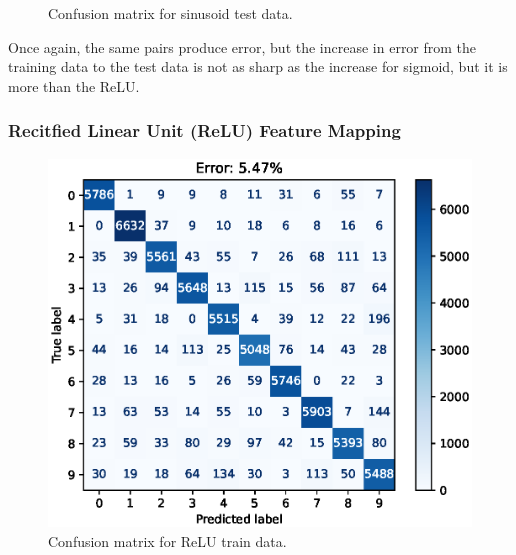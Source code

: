 \documentclass{article}
\begin{document}
\begin{figure}[h!]
\begin{minipage}{0.5\textwidth}
        \caption{Confusion matrix for sinusoid test data.}
    \end{minipage}
\end{figure}
Once again, the same pairs produce error, but the increase in error from the training data to the test data is not as sharp as the increase for sigmoid, but it is more than the ReLU.

\FloatBarrier
\subsubsection{Recitfied Linear Unit (ReLU) Feature Mapping}
\begin{figure}[h!]
    \centering
    \begin{minipage}{0.5\textwidth}
        \centering
        \includegraphics[width=\textwidth]{images/one_vs_all_training_confusion_matrix_ReLU.eps}
        \caption{Confusion matrix for ReLU train data.}
    \end{minipage}\hfill
    \begin{minipage}{0.5\textwidth}      
        \centering

\end{minipage}
\end{figure}
\end{document}
